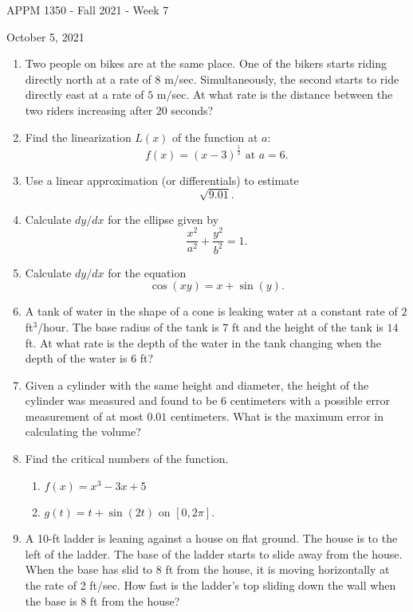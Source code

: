 \documentclass[12pt]{article}
\begin{document}
\begin{center}
	{\Large APPM 1350 - Fall 2021 - Week 7}
	
	{\large October 5, 2021}
\end{center}

\begin{enumerate}[label = \arabic*)]
    \item Two people on bikes are at the same place. One of the bikers starts riding directly north at a rate of $8$ m/sec. Simultaneously, the second starts to ride directly east at a rate of $5$ m/sec. At what rate is the distance between the two riders increasing after $20$ seconds?
    
    \item Find the linearization $L(x)$ of the function at $a$:
	 \[
	 	f(x) =  (x-3)^\frac{1}{2} \text{ at } a = 6.
	 \]
    
	\item  Use a linear approximation (or differentials) to estimate
	\[
		\sqrt{9.01}.
	\]

	\item Calculate $dy/dx$ for the ellipse given by
	\[
		\frac{x^2}{a^2}+\frac{y^2}{b^2} = 1.
	\]
	
	\item Calculate $dy/dx$ for the equation
	\[
		\cos(xy) = x+\sin(y).
	\]
	
	\item A tank of water in the shape of a cone is leaking water at a constant rate of $2$ ft$^3$/hour. The base radius of the tank is $7$ ft and the height of the tank is $14$ ft. At what rate is the depth of the water in the tank changing when the depth of the water is $6$ ft?
	
	\item Given a cylinder with the same height and diameter, the height of the cylinder was measured and found to be $6$ centimeters with a possible error measurement of at most $0.01$ centimeters. What is the maximum error in calculating the volume?
	
	\item Find the critical numbers of the function.
	
	\begin{enumerate}
	    \item $f(x) = x^3 - 3x + 5$
	    \item $g(t) = t + \sin \left( 2t \right)$ on $\left[ 0, 2\pi \right]$.
	\end{enumerate}
	
	\item A 10-ft ladder is leaning against a house on flat ground. The house is to the left of the ladder. The base of the ladder starts to slide away from the house. When the base has slid to 8 ft from the house, it is moving horizontally at the rate of 2 ft/sec. How fast is the ladder’s top sliding down the wall when the base is 8 ft from the house?
	

\end{enumerate}
\end{document}
